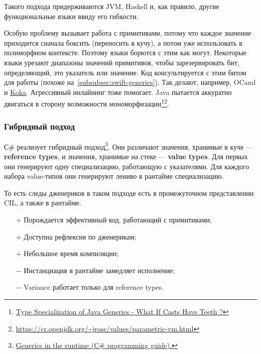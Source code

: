 \documentclass[12pt]{article}
\newcommand{\vocab}[1]{\textbf{#1}} %
\newcommand{\positive}{$+$} %
\newcommand{\negative}{{\color{red} $-$}} %
\begin{document}
    Такого подхода придерживаются JVM, Haskell и, как правило, другие функциональные языки ввиду его гибкости.

    Особую проблему вызывает работа с примитивами, потому что каждое значение приходится сначала боксить (переносить в кучу), а потом уже использовать в полиморфном контексте.
    Поэтому языки борются с этим как могут.
    Некоторые языки урезают диапазоны значений примитивов, чтобы зарезервировать бит, определяющий, это указатель или значение.
    Код консультируется с этим битом для работы (похоже на~\ref{subsubsec:swift-generics}).
    Так делают, например, OCaml и \href{https://koka-lang.github.io/koka/doc/book.html#sec-value-types}{Koka}.
    Агрессивный инлайнинг тоже помогает.
    Java пытается аккуратно двигаться в сторону возможности мономорфизации\footnote{\href{https://youtu.be/JI09cs2yUgY?si=MLkRs31mN1koXIu1}{Type Specialization of Java Generics - What If Casts Have Teeth ?}}\footnote{\url{https://cr.openjdk.org/~jrose/values/parametric-vm.html}}.

    \subsubsection{Гибридный подход}

    С\# реализует гибридный подход\footnote{\href{https://learn.microsoft.com/en-us/dotnet/csharp/programming-guide/generics/generics-in-the-run-time}{Generics in the runtime (C\# programming guide).}}.
    Они различают значения, хранимые в куче --- \vocab{reference types}, и значения, хранимые на стеке --- \vocab{value types}.
    Для первых они генерируют одну специализацию, работающую с указателями.
    Для каждого набора value-типов они генерируют лениво в рантайме специализацию.

    То есть следы дженериков в таком подходе есть в промежуточном представлении CIL, а также в рантайме.

    \begin{itemize}
        \item[\positive] Порождается эффективный код, работающий с примитивами;
        \item[\positive] Доступна рефлексия по дженерикам;
        \item[\positive] Небольшое время компиляции;
        \item[\negative] Инстанциация в рантайме замедляет исполнение;
        \item[\negative] Variance работает только для reference types.
    \end{itemize}
\end{document}
